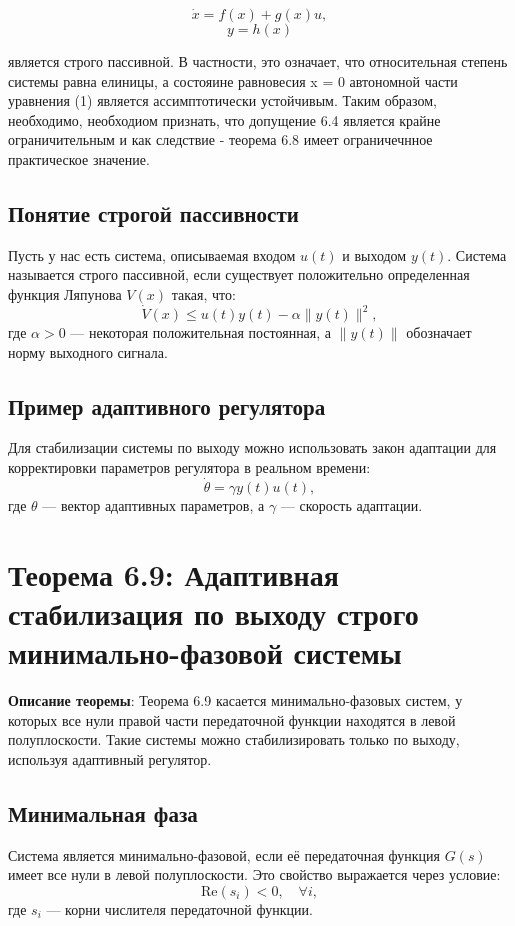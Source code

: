 \documentclass[a4paper,14pt]{extarticle} %
\begin{document}
\begin{equation}
    \dot{x} = f(x) + g(x)u,
\end{equation}
\begin{equation}
    y = h(x)
\end{equation}

является строго пассивной. В частности, это означает, что относительная степень системы равна елиницы, а состояине равновесия x = 0 автономной части уравнения (1) является ассимптотически устойчивым. Таким образом, необходимо, необходиом признать, что допущение 6.4 является крайне ограничительным и как следствие - теорема 6.8 имеет ограничечнное практическое значение.

\subsection*{Понятие строгой пассивности}
Пусть у нас есть система, описываемая входом \( u(t) \) и выходом \( y(t) \). Система называется строго пассивной, если существует положительно определенная функция Ляпунова \( V(x) \) такая, что:
\[
\dot{V}(x) \leq u(t) y(t) - \alpha \|y(t)\|^2,
\]
где \( \alpha > 0 \) — некоторая положительная постоянная, а \( \|y(t)\| \) обозначает норму выходного сигнала.

\subsection*{Пример адаптивного регулятора}
Для стабилизации системы по выходу можно использовать закон адаптации для корректировки параметров регулятора в реальном времени:
\[
\dot{\theta} = \gamma y(t) u(t),
\]
где \( \theta \) — вектор адаптивных параметров, а \( \gamma \) — скорость адаптации.

\section{Теорема 6.9: Адаптивная стабилизация по выходу строго минимально-фазовой системы}
\textbf{Описание теоремы}: Теорема 6.9 касается минимально-фазовых систем, у которых все нули правой части передаточной функции находятся в левой полуплоскости. Такие системы можно стабилизировать только по выходу, используя адаптивный регулятор.

\subsection*{Минимальная фаза}
Система является минимально-фазовой, если её передаточная функция \( G(s) \) имеет все нули в левой полуплоскости. Это свойство выражается через условие:
\[
\text{Re}(s_i) < 0, \quad \forall i,
\]
где \( s_i \) — корни числителя передаточной функции.
\end{document}
